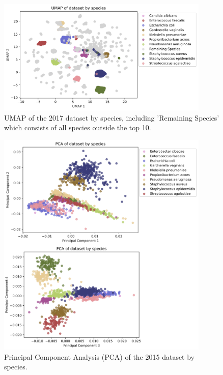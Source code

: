 \documentclass[english,11pt,a4paper,titlepage]{article}
\begin{document}
\begin{figure}[h]
	\centering
	\includegraphics[width=0.9\textwidth]{img/UMAP_species.png}
	\caption{UMAP of the 2017 dataset by species, including 'Remaining Species' which consists of all species outside the top 10.}
	\label{fig:umap_remaining}
\end{figure}

\begin{figure}[h]
	\centering
	\includegraphics[width=0.9\textwidth]{img/PCA_species_2015.png}
	\caption{Principal Component Analysis (PCA) of the 2015 dataset by species.}
	\label{fig:pca_2015}
\end{figure}
\end{document}
